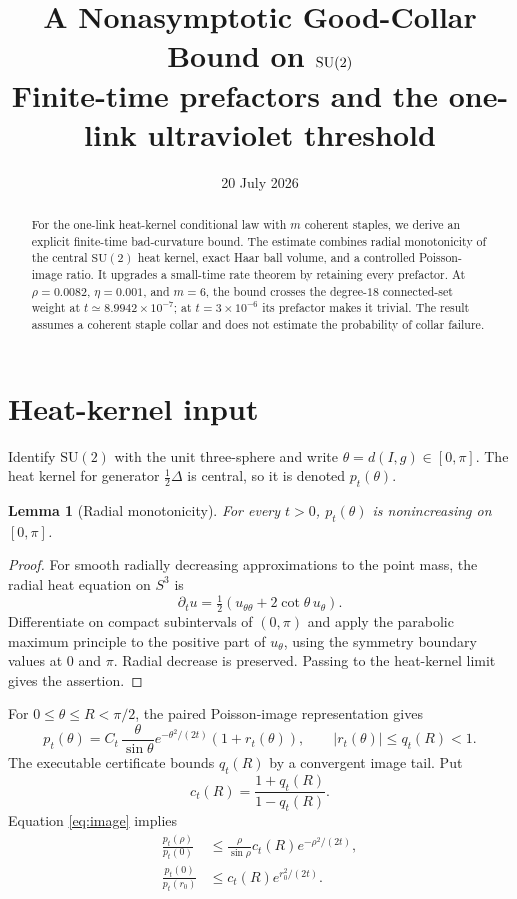 \documentclass[11pt]{article}
\title{A Nonasymptotic Good-Collar Bound on $\SU$\\
\large Finite-time prefactors and the one-link ultraviolet threshold}
\author{}
\date{20 July 2026}
\newtheorem{lemma}[theorem]{Lemma}
\newcommand{\SU}{\mathrm{SU}(2)}
\begin{document}
\maketitle

\begin{abstract}
For the one-link heat-kernel conditional law with $m$ coherent staples, we
derive an explicit finite-time bad-curvature bound.  The estimate combines
radial monotonicity of the central $\SU$ heat kernel, exact Haar ball volume,
and a controlled Poisson-image ratio.  It upgrades a small-time rate theorem
by retaining every prefactor.  At $\rho=0.0082$, $\eta=0.001$, and $m=6$, the
bound crosses the degree-$18$ connected-set weight at
$t\simeq8.9942\times10^{-7}$; at $t=3\times10^{-6}$ its prefactor makes it
trivial.  The result assumes a coherent staple collar and does not estimate
the probability of collar failure.
\end{abstract}

\section{Heat-kernel input}

Identify $\SU$ with the unit three-sphere and write $\theta=d(I,g)\in[0,\pi]$.
The heat kernel for generator $\tfrac12\Delta$ is central, so it is denoted
$p_t(\theta)$.

\begin{lemma}[Radial monotonicity]
For every $t>0$, $p_t(\theta)$ is nonincreasing on $[0,\pi]$.
\end{lemma}
\begin{proof}
For smooth radially decreasing approximations to the point mass, the radial
heat equation on $S^3$ is
\[
 \partial_t u=\tfrac12(u_{\theta\theta}+2\cot\theta\,u_\theta).
\]
Differentiate on compact subintervals of $(0,\pi)$ and apply the parabolic
maximum principle to the positive part of $u_\theta$, using the symmetry
boundary values at $0$ and $\pi$.  Radial decrease is preserved.  Passing to
the heat-kernel limit gives the assertion.
\end{proof}

For $0\leq\theta\leq R<\pi/2$, the paired Poisson-image representation gives
\begin{equation}
 p_t(\theta)=C_t\,\frac{\theta}{\sin\theta}
 e^{-\theta^2/(2t)}(1+r_t(\theta)),\qquad |r_t(\theta)|\leq q_t(R)<1.
 \label{eq:image}
\end{equation}
The executable certificate bounds $q_t(R)$ by a convergent image tail.  Put
\[
 c_t(R)=\frac{1+q_t(R)}{1-q_t(R)}.
\]
Equation \eqref{eq:image} implies
\begin{align}
 \frac{p_t(\rho)}{p_t(0)}
 &\leq \frac{\rho}{\sin\rho}c_t(R)e^{-\rho^2/(2t)},\label{eq:r1}\\
 \frac{p_t(0)}{p_t(r_0)}
 &\leq c_t(R)e^{r_0^2/(2t)}.\label{eq:r2}
\end{align}
\end{document}
